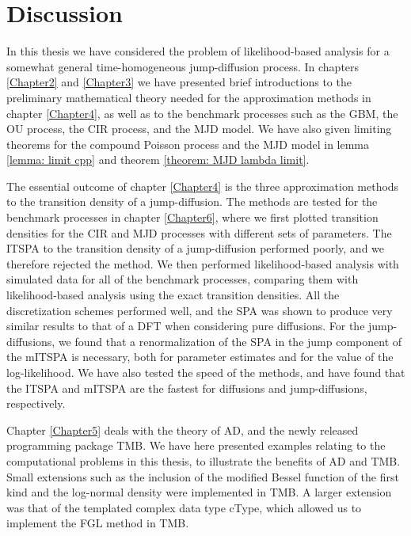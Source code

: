\section{Discussion}
\label{sec::discussion}
In this thesis we have considered the problem of likelihood-based analysis for a somewhat general time-homogeneous jump-diffusion process.
In chapters \ref{Chapter2} and \ref{Chapter3} we have presented brief introductions to the preliminary mathematical theory needed for the approximation methods in chapter \ref{Chapter4}, as well as to the benchmark processes such as the GBM, the OU process, the CIR process, and the MJD model.
We have also given limiting theorems for the compound Poisson process and the MJD model in lemma \ref{lemma: limit cpp} and theorem \ref{theorem: MJD lambda limit}.

The essential outcome of chapter \ref{Chapter4} is the three approximation methods to the transition density of a jump-diffusion.
The methods are tested for the benchmark processes in chapter \ref{Chapter6}, where we first plotted transition densities for the CIR and MJD processes with different sets of parameters.
The ITSPA to the transition density of a jump-diffusion performed poorly, and we therefore rejected the method.
We then performed likelihood-based analysis with simulated data for all of the benchmark processes, comparing them with likelihood-based analysis using the exact transition densities.
All the discretization schemes performed well, and the SPA was shown to produce very similar results to that of a DFT when considering pure diffusions. 
For the jump-diffusions, we found that a renormalization of the SPA in the jump component of the mITSPA is necessary, both for parameter estimates and for the value of the log-likelihood.
We have also tested the speed of the methods, and have found that the ITSPA and mITSPA are the fastest for diffusions and jump-diffusions, respectively.

Chapter \ref{Chapter5} deals with the theory of AD, and the newly released programming package TMB.
We have here presented examples relating to the computational problems in this thesis, to illustrate the benefits of AD and TMB.
Small extensions such as the inclusion of the modified Bessel function of the first kind and the log-normal density were implemented in TMB.
A larger extension was that of the templated complex data type cType, which allowed us to implement the FGL method in TMB.

